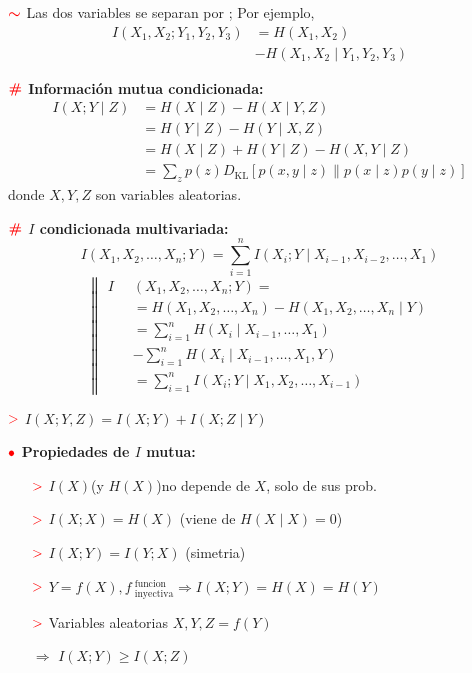 \documentclass[%
 reprint,
 amsmath,amssymb,
 aps,
]{revtex4-1}
\begin{document}
\textbf{$\textcolor{red}{\color{red}{\boldsymbol{\sim}}}$} Las dos variables se separan por ; Por ejemplo, 
$$
\begin{aligned}
  I\left(X_{1}, X_{2} ; Y_{1}, Y_{2}, Y_{3}\right) &= H\left(X_{1}, X_{2}\right) \\
  & - H\left(X_{1}, X_{2} \mid Y_{1}, Y_{2}, Y_{3}\right)
\end{aligned}
$$

\textbf{$\color{red}{\textbf{\#}}$ Información mutua condicionada:}
$$
\begin{aligned}
I(X ; Y \mid Z) &=H(X \mid Z)-H(X \mid Y, Z) \\
&=H(Y \mid Z)-H(Y \mid X, Z) \\
&=H(X \mid Z)+H(Y \mid Z)-H(X, Y \mid Z) \\
&=\sum_{z} p(z) D_{\mathrm{KL}}[p(x, y \mid z) \| p(x \mid z) p(y \mid z)]
\end{aligned}
$$
donde $X, Y, Z$ son variables aleatorias.

\textbf{$\color{red}{\textbf{\#}}$ $I$ condicionada multivariada:} 
$$
I\left(X_{1}, X_{2}, \ldots, X_{n} ; Y\right)=\sum_{i=1}^{n} I\left(X_{i} ; Y \mid X_{i-1}, X_{i-2}, \ldots, X_{1}\right)
$$
$$
\left\|
\begin{aligned}
I & \left(X_{1}, X_{2}, \ldots, X_{n} ; Y\right) = \\
\quad &=H\left(X_{1}, X_{2}, \ldots, X_{n}\right)-H\left(X_{1}, X_{2}, \ldots, X_{n} \mid Y\right) \\
\quad &=\sum_{i=1}^{n} H\left(X_{i} \mid X_{i-1}, \ldots, X_{1}\right)\\
&-\sum_{i=1}^{n} H\left(X_{i} \mid X_{i-1}, \ldots, X_{1}, Y\right) \\
\quad &=\sum_{i=1}^{n} I\left(X_{i} ; Y \mid X_{1}, X_{2}, \ldots, X_{i-1}\right)
\end{aligned}
\right.
$$

\textbf{$\textcolor{red}{\mathbf{>}}$} $ I(X ; Y, Z)=I(X ; Y)+I(X ; Z \mid Y) $

\textbf{$\color{red}{\bullet}$ Propiedades de $I$ mutua: }

\begin{enumerate}
  \item[$\textcolor{red}{\mathbf{>}}$] $I(X)$(y $H(X)$)no depende de $X$, solo de sus prob.
  \item[$\textcolor{red}{\mathbf{>}}$] $ I(X ; X)=H(X) $ (viene de $H(X \mid X)=0$)
  \item[$\textcolor{red}{\mathbf{>}}$] $ I(X ; Y)=I(Y ; X) $ (simetria)
  \item[$\textcolor{red}{\mathbf{>}}$]   
  $Y=f(X), f \ ^\text{funcion}_\text{inyectiva} \Rightarrow I(X ; Y)=H(X)=H(Y)$
  \item[$\textcolor{red}{\mathbf{>}}$] Variables aleatorias $X, Y, Z=f(Y)$ 
  
  $\Rightarrow$
  $I(X ; Y) \geq I(X ; Z)$
\end{enumerate}
\end{document}
